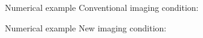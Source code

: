 \documentclass[xcolor=dvipsnames,notes]{beamer}
\begin{document}
\begin{frame}{Numerical example}
Conventional imaging condition:
\begin{figure}
\end{figure}
\end{frame}
\begin{frame}{Numerical example}
New imaging condition:
\begin{figure}
\end{figure}
\end{frame}
\end{document}
